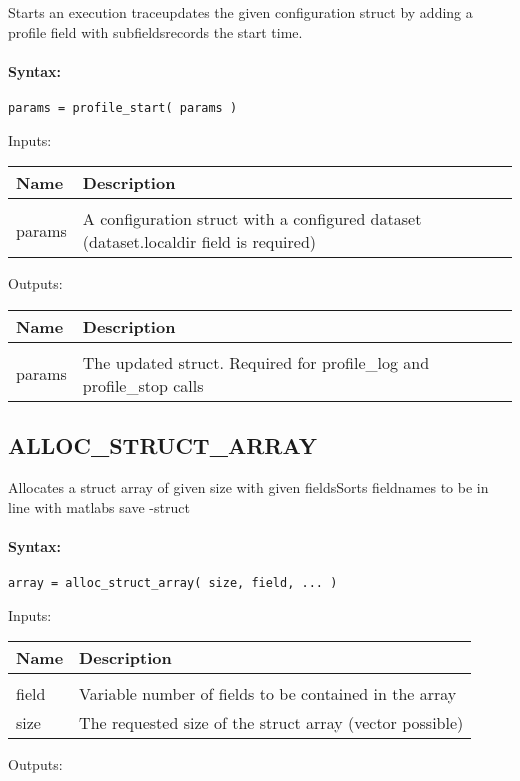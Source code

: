 Starts an execution traceupdates the given configuration struct by adding a profile field with subfieldsrecords the start time.

\paragraph{Syntax:} \verb|params = profile_start( params )|

Inputs:

\begin{tabular}{|l|p{5cm}|}
\hline
\textbf{Name} & \textbf{Description} \\
\hline \hline \\
params & A configuration struct with a configured dataset (dataset.localdir field is required)  \\ \hline
\end{tabular}
Outputs:

\begin{tabular}{|l|p{5cm}|}
\hline
\textbf{Name} & \textbf{Description} \\
\hline \hline \\
params & The updated struct. Required for profile\_log and profile\_stop calls  \\ \hline
\end{tabular}

\subsection{ALLOC\_STRUCT\_ARRAY}

Allocates a struct array of given size with given fieldsSorts fieldnames to be in line with matlabs save -struct

\paragraph{Syntax:} \verb|array = alloc_struct_array( size, field, ... )|

Inputs:

\begin{tabular}{|l|p{5cm}|}
\hline
\textbf{Name} & \textbf{Description} \\
\hline \hline \\
field & Variable number of fields to be contained in the array  \\ \hline
size & The requested size of the struct array (vector possible)  \\ \hline
\end{tabular}
Outputs:

